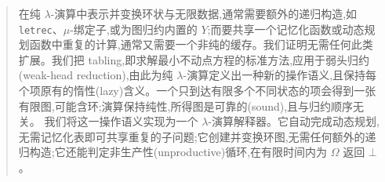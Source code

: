 \begin{CJK*}{UTF8}{gbsn}
  \ifTablambdaBody
  \begin{abstract}
    \ifTablambdaChinese
    在纯 $\lambda$-演算中表示并变换环状与无限数据,通常需要额外的递归构造,如 \texttt{letrec}、$\mu$-绑定子,或为图归约内置的 $Y$;而要共享一个记忆化函数或动态规划函数中重复的计算,通常又需要一个非纯的缓存。我们证明无需任何此类扩展。我们把 tabling,即求解最小不动点方程的标准方法,应用于弱头归约(weak-head reduction),由此为纯 $\lambda$-演算定义出一种新的操作语义,且保持每个项原有的惰性(lazy)含义。一个只到达有限多个不同状态的项会得到一张有限图,可能含环;演算保持纯性,所得图是可靠的(sound),且与归约顺序无关。%
    我们将这一操作语义实现为一个 $\lambda$-演算解释器。它自动完成动态规划,无需记忆化表即可共享重复的子问题;它创建并变换环图,无需任何额外的递归构造;它还能判定非生产性(unproductive)循环,在有限时间内为 $\Omega$ 返回 $\bot$。


\end{abstract}
\end{CJK*}
